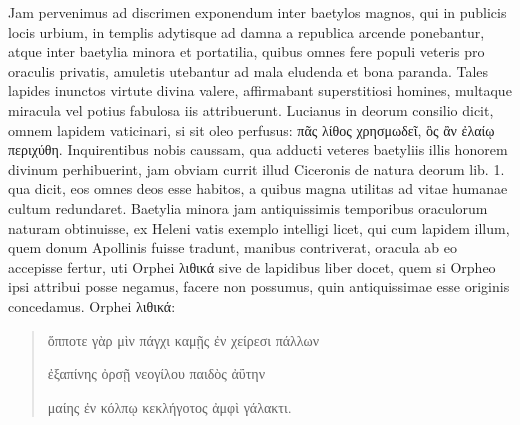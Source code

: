\documentclass[a4paper, 11pt, oneside, polutonikogreek, german]{article}
\begin{document}
Jam pervenimus ad discrimen exponendum inter baetylos magnos, qui in publicis locis urbium, in templis adytisque ad damna a republica arcende ponebantur, atque inter baetylia minora et portatilia, quibus omnes fere populi veteris pro oraculis privatis, amuletis utebantur ad mala eludenda et bona paranda. Tales lapides inunctos virtute divina valere, affirmabant superstitiosi homines, multaque miracula vel potius fabulosa iis attribuerunt. Lucianus in deorum consilio dicit, omnem lapidem vaticinari, si sit oleo perfusus: πᾶς λίθος χρησμωδεῖ, ὃς ἂν ἐλαίῳ περιχύθη. Inquirentibus nobis caussam, qua adducti veteres baetyliis illis honorem divinum perhibuerint, jam obviam currit illud Ciceronis de natura deorum lib. 1. qua dicit, eos omnes deos esse habitos, a quibus magna utilitas ad vitae humanae cultum redundaret. Baetylia minora jam antiquissimis temporibus oraculorum naturam obtinuisse, ex Heleni vatis exemplo intelligi licet, qui cum lapidem illum, quem donum Apollinis fuisse tradunt, manibus contriverat, oracula ab eo accepisse fertur, uti Orphei λιθικά sive de lapidibus liber docet, quem si Orpheo ipsi attribui posse negamus, facere non possumus, quin antiquissimae esse originis concedamus. Orphei λιθικά:
\begin{quotation}
ὅπποτε γὰρ μὶν πάγχι καμῇς ἐν χείρεσι πάλλων

ἐξαπίνης ὀρσῇ νεογίλου παιδὸς ἀΰτην

μαίης ἐν κόλπῳ κεκλήγοτος ἀμφὶ γάλακτι.
\end{quotation}
\end{document}
